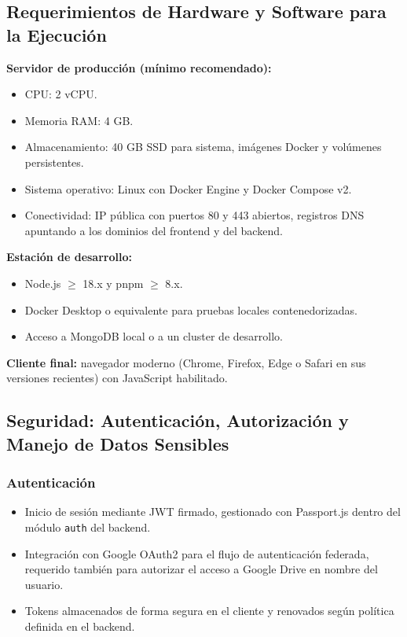 \subsection{Requerimientos de Hardware y Software para la Ejecución}

\textbf{Servidor de producción (mínimo recomendado):}
\begin{itemize}
    \item CPU: 2 vCPU.
    \item Memoria RAM: 4 GB.
    \item Almacenamiento: 40 GB SSD para sistema, imágenes Docker y volúmenes persistentes.
    \item Sistema operativo: Linux con Docker Engine y Docker Compose v2.
    \item Conectividad: IP pública con puertos 80 y 443 abiertos, registros DNS apuntando a los dominios del frontend y del backend.
\end{itemize}

\textbf{Estación de desarrollo:}
\begin{itemize}
    \item Node.js $\geq$ 18.x y pnpm $\geq$ 8.x.
    \item Docker Desktop o equivalente para pruebas locales contenedorizadas.
    \item Acceso a MongoDB local o a un cluster de desarrollo.
\end{itemize}

\textbf{Cliente final:} navegador moderno (Chrome, Firefox, Edge o Safari en sus versiones recientes) con JavaScript habilitado.

\subsection{Seguridad: Autenticación, Autorización y Manejo de Datos Sensibles}

\subsubsection{Autenticación}
\begin{itemize}
    \item Inicio de sesión mediante JWT firmado, gestionado con Passport.js dentro del módulo \texttt{auth} del backend.
    \item Integración con Google OAuth2 para el flujo de autenticación federada, requerido también para autorizar el acceso a Google Drive en nombre del usuario.
    \item Tokens almacenados de forma segura en el cliente y renovados según política definida en el backend.
\end{itemize}


